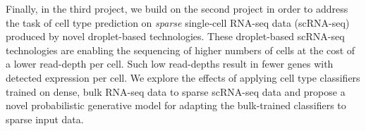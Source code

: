  Finally, in the third project, we build on the second project in order to address the task of cell type prediction on \textit{sparse} single-cell RNA-seq data (scRNA-seq) produced by novel droplet-based technologies.  These droplet-based scRNA-seq technologies are enabling the sequencing of higher numbers of cells at the cost of a lower read-depth per cell. Such low read-depths result in fewer genes with detected expression per cell.  We explore the effects of applying cell type classifiers trained on dense, bulk RNA-seq data to sparse scRNA-seq data and propose a novel probabilistic generative model for adapting the bulk-trained classifiers to sparse input data.


